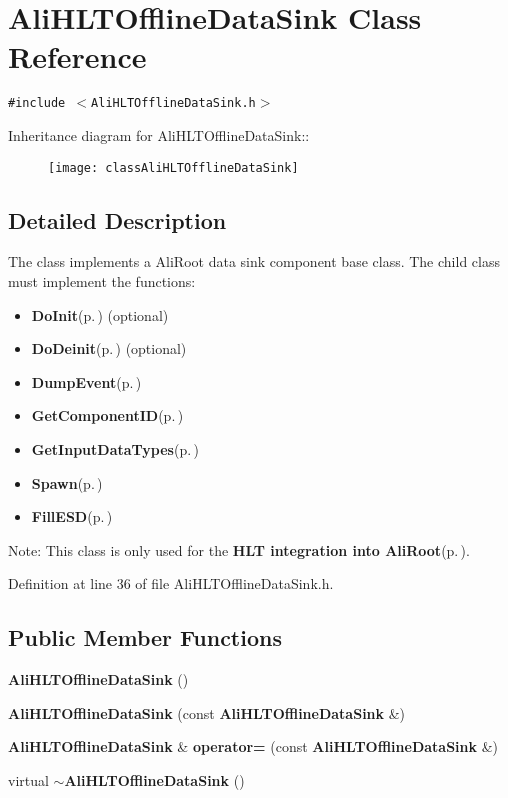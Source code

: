 \section{Ali\-HLTOffline\-Data\-Sink Class Reference}
\label{classAliHLTOfflineDataSink}
{\tt \#include $<$Ali\-HLTOffline\-Data\-Sink.h$>$}

Inheritance diagram for Ali\-HLTOffline\-Data\-Sink::\begin{figure}[H]
\begin{center}
\leavevmode
\texttt{[image: classAliHLTOfflineDataSink]}
\end{center}
\end{figure}


\subsection{Detailed Description}
The class implements a Ali\-Root data sink component base class. The child class must implement the functions:\begin{itemize}
\item {\bf Do\-Init}{\rm (p.\,\pageref{classAliHLTComponent_b5})} (optional)\item {\bf Do\-Deinit}{\rm (p.\,\pageref{classAliHLTComponent_b6})} (optional)\item {\bf Dump\-Event}{\rm (p.\,\pageref{classAliHLTDataSink_d0})}\item {\bf Get\-Component\-ID}{\rm (p.\,\pageref{classAliHLTComponent_a9})}\item {\bf Get\-Input\-Data\-Types}{\rm (p.\,\pageref{classAliHLTComponent_a10})}\item {\bf Spawn}{\rm (p.\,\pageref{classAliHLTComponent_a13})}\item {\bf Fill\-ESD}{\rm (p.\,\pageref{classAliHLTOfflineInterface_a11})}\end{itemize}


\begin{Desc}
\item[Note:]This class is only used for the {\bf HLT integration into Ali\-Root}{\rm (p.\,\pageref{group__alihlt__system})}. \end{Desc}




Definition at line 36 of file Ali\-HLTOffline\-Data\-Sink.h.\subsection*{Public Member Functions}
\begin{CompactItemize}
\item 
{\bf Ali\-HLTOffline\-Data\-Sink} ()
\item 
{\bf Ali\-HLTOffline\-Data\-Sink} (const {\bf Ali\-HLTOffline\-Data\-Sink} \&)
\item 
{\bf Ali\-HLTOffline\-Data\-Sink} \& {\bf operator=} (const {\bf Ali\-HLTOffline\-Data\-Sink} \&)
\item 
virtual {\bf $\sim$Ali\-HLTOffline\-Data\-Sink} ()
\end{CompactItemize}
